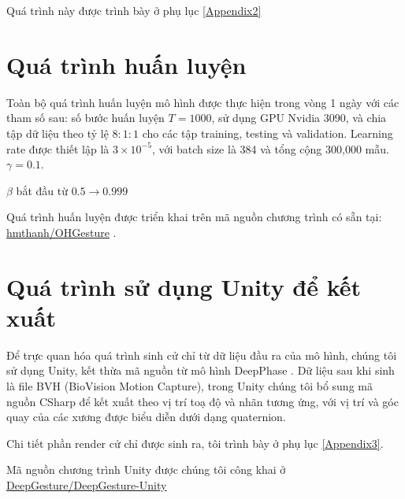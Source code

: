 Quá trình này được trình bày ở phụ lục \ref{Appendix2}

\section{Quá trình huấn luyện}

Toàn bộ quá trình huấn luyện mô hình được thực hiện trong vòng 1 ngày với các tham số sau: số bước huấn luyện $T = 1000$, sử dụng GPU Nvidia 3090, và chia tập dữ liệu theo tỷ lệ $8:1:1$ cho các tập training, testing và validation. Learning rate được thiết lập là $3 \times 10^{-5}$, với batch size là 384 và tổng cộng 300,000 mẫu. 
$\gamma = 0.1$.

$\beta$ bắt đầu từ $0.5 \rightarrow 0.999$

Quá trình huấn luyện được triển khai trên mã nguồn chương trình có sẵn tại: \hyperlink{https://github.com/hmthanh/OHGesture}{hmthanh/OHGesture} .


\section{Quá trình sử dụng Unity để kết xuất}

Để trực quan hóa quá trình sinh cử chỉ từ dữ liệu đầu ra của mô hình, chúng tôi sử dụng Unity, kết thừa mã nguồn từ mô hình DeepPhase \cite{starke2022deepphase}  . Dữ liệu sau khi sinh là file BVH (BioVision Motion Capture), trong Unity chúng tôi bổ sung mã nguồn CSharp để kết xuất theo vị trí toạ độ và nhãn tương ứng, với vị trí và góc quay của các xương được biểu diễn dưới dạng quaternion.

Chi tiết phần render cử chỉ được sinh ra, tôi trình bày ở phụ lục \ref{Appendix3}.

Mã nguồn chương trình Unity được chúng tôi công khai ở \hyperlink{https://github.com/DeepGesture/deepgesture-unity}{DeepGesture/DeepGesture-Unity}
